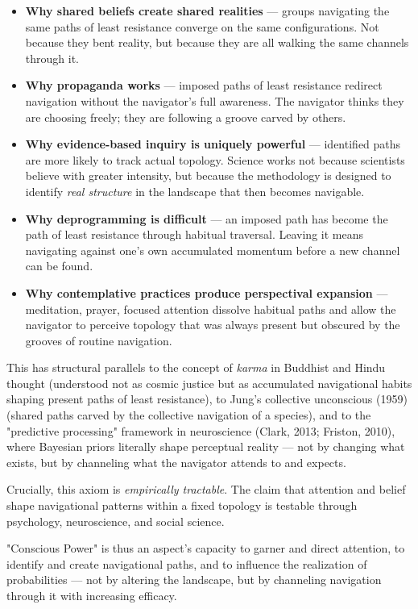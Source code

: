 \begin{itemize}[nosep,leftmargin=*]
  \item \textbf{Why shared beliefs create shared realities} — groups navigating the same paths of least resistance converge on the same configurations. Not because they bent reality, but because they are all walking the same channels through it.
  \item \textbf{Why propaganda works} — imposed paths of least resistance redirect navigation without the navigator's full awareness. The navigator thinks they are choosing freely; they are following a groove carved by others.
  \item \textbf{Why evidence-based inquiry is uniquely powerful} — identified paths are more likely to track actual topology. Science works not because scientists believe with greater intensity, but because the methodology is designed to identify \textit{real structure} in the landscape that then becomes navigable.
  \item \textbf{Why deprogramming is difficult} — an imposed path has become the path of least resistance through habitual traversal. Leaving it means navigating against one's own accumulated momentum before a new channel can be found.
  \item \textbf{Why contemplative practices produce perspectival expansion} — meditation, prayer, focused attention dissolve habitual paths and allow the navigator to perceive topology that was always present but obscured by the grooves of routine navigation.
\end{itemize}


This has structural parallels to the concept of \textit{karma} in Buddhist and Hindu thought (understood not as cosmic justice but as accumulated navigational habits shaping present paths of least resistance), to Jung's collective unconscious (1959) (shared paths carved by the collective navigation of a species), and to the "predictive processing" framework in neuroscience (Clark, 2013; Friston, 2010), where Bayesian priors literally shape perceptual reality — not by changing what exists, but by channeling what the navigator attends to and expects.


Crucially, this axiom is \textit{empirically tractable}. The claim that attention and belief shape navigational patterns within a fixed topology is testable through psychology, neuroscience, and social science.


"Conscious Power" is thus an aspect's capacity to garner and direct attention, to identify and create navigational paths, and to influence the realization of probabilities — not by altering the landscape, but by channeling navigation through it with increasing efficacy.



